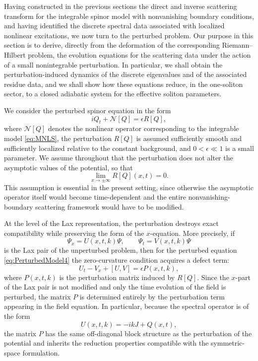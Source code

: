 \documentclass[11pt]{amsart}
\theoremstyle{definition}
\numberwithin{equation}{section}
\begin{document}
Having constructed in the previous sections the direct and inverse scattering transform for the integrable spinor model with nonvanishing boundary conditions, and having identified the discrete spectral data associated with localized nonlinear excitations, we now turn to the perturbed problem. Our purpose in this section is to derive, directly from the deformation of the corresponding Riemann--Hilbert problem, the evolution equations for the scattering data under the action of a small nonintegrable perturbation. In particular, we shall obtain the perturbation-induced dynamics of the discrete eigenvalues and of the associated residue data, and we shall show how these equations reduce, in the one-soliton sector, to a closed adiabatic system for the effective soliton parameters.

We consider the perturbed spinor equation in the form
\begin{equation}
iQ_t + \mathcal{N}[Q] = \epsilon R[Q],
\label{eq:PerturbedModel4}
\end{equation}
where $\mathcal{N}[Q]$ denotes the nonlinear operator corresponding to the integrable model \eqref{eq:MNLS}, the perturbation $R[Q]$ is assumed sufficiently smooth and sufficiently localized relative to the constant background, and $0<\epsilon\ll 1$ is a small parameter. We assume throughout that the perturbation does not alter the asymptotic values of the potential, so that
\begin{equation}
\lim_{x\to\pm\infty} R[Q](x,t)=0.
\label{eq:Rdecay4}
\end{equation}
This assumption is essential in the present setting, since otherwise the asymptotic operator itself would become time-dependent and the entire nonvanishing-boundary scattering framework would have to be modified.

At the level of the Lax representation, the perturbation destroys exact compatibility while preserving the form of the $x$-equation. More precisely, if
\begin{equation}
\Psi_x = U(x,t,k)\Psi, \qquad \Psi_t = V(x,t,k)\Psi
\label{eq:PerturbedLax4}
\end{equation}
is the Lax pair of the unperturbed problem, then for the perturbed equation \eqref{eq:PerturbedModel4} the zero-curvature condition acquires a defect term:
\begin{equation}
U_t - V_x + [U,V] = \epsilon P(x,t,k),
\label{eq:ZeroCurvaturePerturbed4}
\end{equation}
where $P(x,t,k)$ is the perturbation matrix induced by $R[Q]$. Since the $x$-part of the Lax pair is not modified and only the time evolution of the field is perturbed, the matrix $P$ is determined entirely by the perturbation term appearing in the field equation. In particular, because the spectral operator is of the form
\[
U(x,t,k)=-ikJ+Q(x,t),
\]
the matrix $P$ has the same off-diagonal block structure as the perturbation of the potential and inherits the reduction properties compatible with the symmetric-space formulation.
\end{document}
